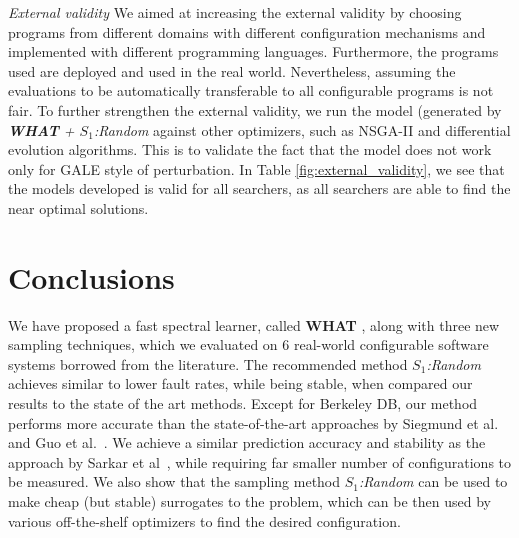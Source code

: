 \documentclass{sig-alternative}
\newcommand{\what}{{\bf WHAT }}
\begin{document}
{\em External validity}  We aimed at increasing the external validity by choosing programs from different domains with different configuration mechanisms and implemented with different programming languages. Furthermore, the programs used are deployed and used in the real world. Nevertheless, assuming the evaluations to be automatically transferable  to all configurable programs is not fair. To further strengthen the external validity, we run the model (generated by \textit{\what + $S_1$:Random} against other optimizers, such as NSGA-II and differential evolution algorithms\cite{storn1997differential}. This is to validate the fact that the model does not work only for GALE style of perturbation. In Table \ref{fig:external_validity}, we see that the models developed is valid for all searchers, as all searchers are able to find the near optimal solutions.







\section{Conclusions}



We have proposed a fast spectral learner, called \what,  along with three new sampling techniques, which we evaluated on 6 real-world configurable software systems borrowed from the literature. The recommended method \textit{$S_1$:Random} achieves similar to lower fault rates, while being stable, when compared our results to the state of the art methods. 
Except for Berkeley DB, our method performs more accurate than the state-of-the-art approaches by Siegmund et al.~\cite{siegmund2012predicting} and Guo et al.~\cite{guo2013variability}. We achieve a similar prediction accuracy and stability as the approach by Sarkar et al~\cite{sarkar2015cost}, while requiring far smaller number of configurations to be measured. We also show that the sampling method \textit{$S_1$:Random} can be used to make cheap (but stable) surrogates to the problem, which can be then used by various off-the-shelf optimizers to find the desired configuration. 
\end{document}
